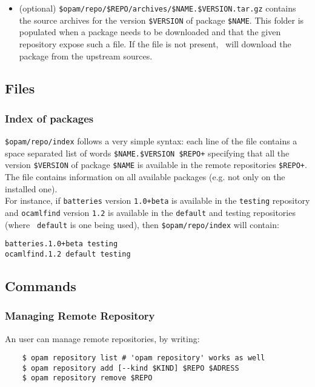 \documentclass[a4paper,10pt]{article}
\begin{document}
\begin{itemize}
\item (optional)
  \verb+$opam/repo/$REPO/archives/$NAME.$VERSION.tar.gz+ contains the
  source archives for the version \verb+$VERSION+ of package
  \verb+$NAME+. This folder is populated when a package needs to be
  downloaded and that the given repository expose such a file. If the
  file is not present, \OPAM\ will download the package from the
  upstream sources.

\end{itemize}

\subsection{Files}

\subsubsection{Index of packages}
\label{file:index}

\verb+$opam/repo/index+ follows a very simple syntax: each line of the
file contains a space separated list of words
\verb|$NAME.$VERSION $REPO+| specifying that all the version
\verb+$VERSION+ of package \verb+$NAME+ is available in the remote
repositories \verb|$REPO+|. The file contains information on all
available packages (e.g. not only on the installed one). \\

For instance, if {\tt batteries} version {\tt 1.0+beta} is available
in the {\tt testing} repository and {\tt ocamlfind} version {\tt 1.2}
is available in the {\tt default} and testing repositories (where {\tt
  default} is one being used), then \verb+$opam/repo/index+ will
contain:

\begin{Verbatim}
batteries.1.0+beta testing
ocamlfind.1.2 default testing
\end{Verbatim}

\subsection{Commands}

\subsubsection{Managing Remote Repository}

An user can manage remote repositories, by writing:

\begin{verbatim}
    $ opam repository list # 'opam repository' works as well
    $ opam repository add [--kind $KIND] $REPO $ADRESS
    $ opam repository remove $REPO
\end{verbatim}
\end{document}
